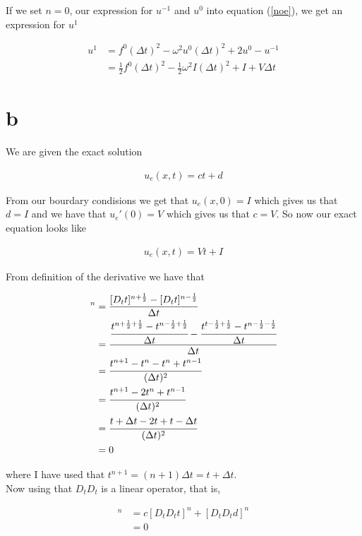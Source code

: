 \documentclass[12pt, a4paper]{article}
\begin{document}
{If we set \(n = 0\), our expression for \(u^{-1}\) and \(u^0\) into equation (\ref{noe}), we get an expression for \(u^1\) 

\begin{align*}
	u^1 &= f^0(\Delta t)^2 - \omega^2 u^0 (\Delta t)^2 + 2u^0 - u^{-1} \\
		&= \frac{1}{2}f^0(\Delta t)^2 - \frac{1}{2}\omega^2 I (\Delta t)^2 + I + V\Delta t
\end{align*}

\section*{b}

We are given the exact solution

\begin{align*}
	u_e(x,t) = ct + d
\end{align*}

From our bourdary condisions we get that \(u_e(x,0) = I\) which gives us that \(d = I\) and we have that \(u_{e}'(0) = V\) which gives us that \(c = V\). So now our exact equation looks like

\begin{align}\label{noe2}
	u_e(x,t) = Vt + I
\end{align}

From definition of the derivative we have that

\begin{align*}
	[D_t D_t t]^n &= \frac{[D_t t]^{n + \frac{1}{2}} - [D_t t]^{n - \frac{1}{2}}}{\Delta t} \\
				&= \cfrac{\cfrac{t^{n + \frac{1}{2} + \frac{1}{2}} - t^{n - \frac{1}{2} + \frac{1}{2}}}{\Delta t} - \cfrac{t^{t - \frac{1}{2} + \frac{1}{2}} - t^{n - \frac{1}{2} - \frac{1}{2}}}{\Delta t}}{\Delta t} \\
				&= \cfrac{t^{n+1} - t^n - t^n + t^{n-1}}{(\Delta t)^2} \\
				&= \cfrac{t^{n+1} - 2t^n + t^{n-1}}{(\Delta t)^2} \\
				&= \cfrac{t + \Delta t - 2t + t - \Delta t}{(\Delta t)^2} \\
				&= 0
\end{align*}

where I have used that \(t^{n+1} = (n + 1)\Delta t = t + \Delta t\).  \\

Now using that \(D_t D_t\) is a linear operator, that is,

\begin{align*}
	[D_t D_t (ct + d)]^n &= c[D_t D_t t]^n + [D_t D_t d]^n \\
						&= 0
\end{align*}

}
\end{document}

